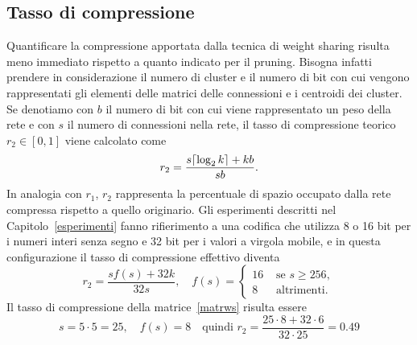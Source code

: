 \documentclass[11pt,a4paper,twoside,
openright]{book}
\DeclarePairedDelimiter{\ceil}{\lceil}{\rceil}
\begin{document}
\subsection{Tasso di compressione}
\label{sec:tassows}
Quantificare la compressione apportata dalla tecnica di weight sharing risulta meno immediato rispetto a quanto indicato per il pruning. Bisogna infatti prendere in considerazione il numero di cluster e il numero di bit con cui vengono rappresentati gli elementi delle matrici delle connessioni e i centroidi dei cluster. Se denotiamo con $b$ il numero di bit con cui viene rappresentato un peso della rete e con $s$ il numero di connessioni nella rete, il tasso di compressione teorico $r_2 \in [0, 1]$ viene calcolato come
\begin{equation}
r_2=\frac{s\ceil{\log_2 k}+kb}{sb}.
\label{tassowsteo}
\end{equation}
In analogia con $r_1$, $r_2$ rappresenta la percentuale di spazio occupato dalla rete compressa rispetto a quello originario.
Gli esperimenti descritti nel Capitolo~\ref{esperimenti} fanno rifierimento a una codifica che utilizza 8 o 16 bit per i numeri interi senza segno e 32 bit per i valori a virgola mobile, e in questa configurazione il tasso di compressione effettivo diventa 
\begin{equation}
r_2=\frac{s f(s) +32k}{32s}, \quad
f(s)=\begin{cases}
16 &\text{ se } s\geq256, \\
8 &\text{ altrimenti}.
\end{cases}
\label{tassows}
\end{equation}
Il tasso di compressione della matrice~\ref{matrws} risulta essere
\begin{equation}
s=5	\cdot 5 = 25, \quad
f(s)=8 \quad
\text{quindi }
r_2=\frac{25\cdot8+32\cdot6}{32\cdot25}=0.49
\label{r2esempio}
\end{equation}
\end{document}
